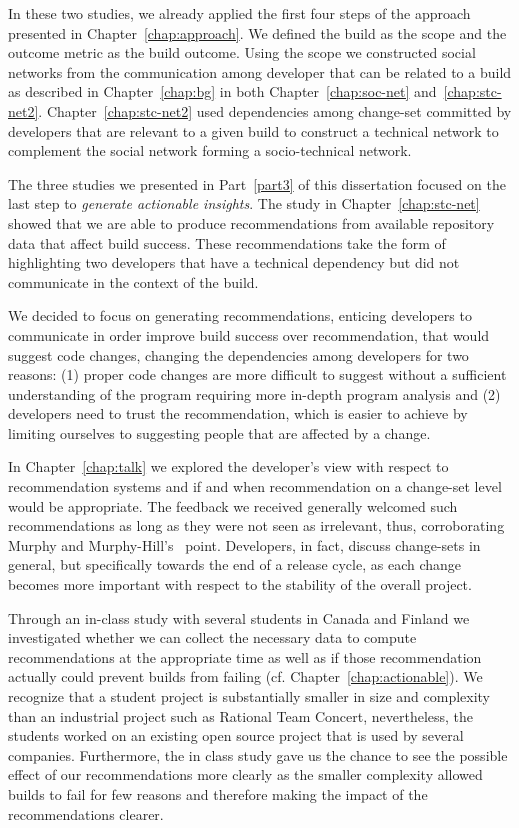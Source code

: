 In these two studies, we already applied the first four steps of the approach presented in Chapter~\ref{chap:approach}.
We defined the build as the scope and the outcome metric as the build outcome.
Using the scope we constructed social networks from the communication among developer that can be related to a build as described in Chapter~\ref{chap:bg} in both Chapter~\ref{chap:soc-net} and~\ref{chap:stc-net2}.
Chapter~\ref{chap:stc-net2} used dependencies among change-set committed by developers that are relevant to a given build to construct a technical network to complement the social network forming a socio-technical network.

The three studies we presented in Part~\ref{part3} of this dissertation focused on the last step to \emph{generate actionable insights}.
The study in Chapter~\ref{chap:stc-net} showed that we are able to produce recommendations from available repository data that affect build success.
These recommendations take the form of highlighting two developers that have a technical dependency but did not communicate in the context of the build.

We decided to focus on generating recommendations, enticing developers to communicate in order improve build success over recommendation, that would suggest code changes, changing the dependencies among developers for two reasons:
(1) proper code changes are more difficult to suggest without a sufficient understanding of the program requiring more in-depth program analysis and 
(2) developers need to trust the recommendation, which is easier to achieve by limiting ourselves to suggesting people that are affected by a change.

In Chapter~\ref{chap:talk} we explored the developer's view with respect to recommendation systems and if and when recommendation on a change-set level would be appropriate.
The feedback we received generally welcomed such recommendations as long as they were not seen as irrelevant, thus, corroborating Murphy and Murphy-Hill's~\cite{murphy:rsse:2010} point.
Developers, in fact, discuss change-sets in general, but specifically towards the end of a release cycle, as each change becomes more important with respect to the stability of the overall project.

Through an in-class study with several students in Canada and Finland we investigated whether we can collect the necessary data to compute recommendations at the appropriate time as well as if those recommendation actually could prevent builds from failing (cf. Chapter~\ref{chap:actionable}).
We recognize that a student project is substantially smaller in size and complexity than an industrial project such as Rational Team Concert, nevertheless, the students worked on an existing open source project that is used by several companies.
Furthermore, the in class study gave us the chance to see the possible effect of our recommendations more clearly as the smaller complexity allowed builds to fail for few reasons and therefore making the impact of the recommendations clearer.

